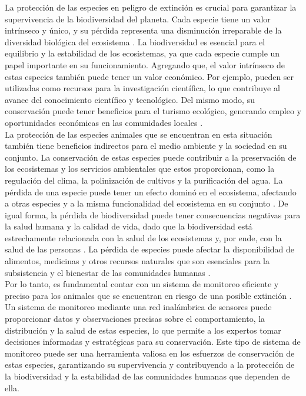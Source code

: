 La protección de las especies en peligro de extinción es crucial para garantizar la supervivencia de la biodiversidad del planeta. Cada especie tiene un valor intrínseco y único, y su pérdida representa una disminución irreparable de la diversidad biológica del ecosistema \cite{9}. La biodiversidad es esencial para el equilibrio y la estabilidad de los ecosistemas, ya que cada especie cumple un papel importante en su funcionamiento. Agregando que, el valor intrínseco de estas especies también puede tener un valor económico. Por ejemplo, pueden ser utilizadas como recursos para la investigación científica, lo que contribuye al avance del conocimiento científico y tecnológico. Del mismo modo, su conservación puede tener beneficios para el turismo ecológico, generando empleo y oportunidades económicas en las comunidades locales \cite{10}. \\
La protección de las especies animales que se encuentran en esta situación también tiene beneficios indirectos para el medio ambiente y la sociedad en su conjunto. La conservación de estas especies puede contribuir a la preservación de los ecosistemas y los servicios ambientales que estos proporcionan, como la regulación del clima, la polinización de cultivos y la purificación del agua. La pérdida de una especie puede tener un efecto dominó en el ecosistema, afectando a otras especies y a la misma funcionalidad del ecosistema en su conjunto \cite{11}. De igual forma, la pérdida de biodiversidad puede tener consecuencias negativas para la salud humana y la calidad de vida, dado que la biodiversidad está estrechamente relacionada con la salud de los ecosistemas y, por ende, con la salud de las personas \cite{12}. La pérdida de especies puede afectar la disponibilidad de alimentos, medicinas y otros recursos naturales que son esenciales para la subsistencia y el bienestar de las comunidades humanas \cite{13}. \\
Por lo tanto, es fundamental contar con un sistema de monitoreo eficiente y preciso para los animales que se encuentran en riesgo de una posible extinción \cite{14}. Un sistema de monitoreo mediante una red inalámbrica de sensores puede proporcionar datos y observaciones precisas sobre el comportamiento, la distribución y la salud de estas especies, lo que permite a los expertos tomar decisiones informadas y estratégicas para su conservación. Este tipo de sistema de monitoreo puede ser una herramienta valiosa en los esfuerzos de conservación de estas especies, garantizando su supervivencia y contribuyendo a la protección de la biodiversidad y la estabilidad de las comunidades humanas que dependen de ella.


